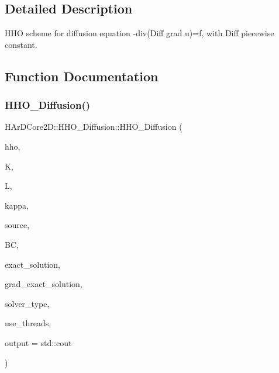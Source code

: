 \subsection{Detailed Description}
H\+HO scheme for diffusion equation -\/div(Diff grad u)=f, with Diff piecewise constant. 



\subsection{Function Documentation}
\mbox{\label{group__HHO__Diffusion_ga5dd0238ced5e1ace4c0581d779e4e76d}} 
\subsubsection{\texorpdfstring{H\+H\+O\+\_\+\+Diffusion()}{HHO\_Diffusion()}}
{\footnotesize\ttfamily H\+Ar\+D\+Core2\+D\+::\+H\+H\+O\+\_\+\+Diffusion\+::\+H\+H\+O\+\_\+\+Diffusion (\begin{DoxyParamCaption}\item[{\hyperlink{classHArDCore2D_1_1HybridCore}{Hybrid\+Core} \&}]{hho,  }\item[{size\+\_\+t}]{K,  }\item[{int}]{L,  }\item[{\hyperlink{classHArDCore2D_1_1HHO__Diffusion_a5c4f7bf42c46d5bd8fde47396c2a9de5}{tensor\+\_\+function\+\_\+type}}]{kappa,  }\item[{\hyperlink{classHArDCore2D_1_1HHO__Diffusion_afc8040de1122421f070bb19231db5431}{source\+\_\+function\+\_\+type}}]{source,  }\item[{\hyperlink{classBoundaryConditions}{Boundary\+Conditions}}]{BC,  }\item[{\hyperlink{classHArDCore2D_1_1HHO__Diffusion_ad64a9a3249e7345e7dbaafb7b578f524}{solution\+\_\+function\+\_\+type}}]{exact\+\_\+solution,  }\item[{\hyperlink{classHArDCore2D_1_1HHO__Diffusion_a9f9412bc2a0a28033591d2e8a5750d90}{grad\+\_\+function\+\_\+type}}]{grad\+\_\+exact\+\_\+solution,  }\item[{std\+::string}]{solver\+\_\+type,  }\item[{bool}]{use\+\_\+threads,  }\item[{std\+::ostream \&}]{output = {\ttfamily std\+:\+:cout} }\end{DoxyParamCaption})}



